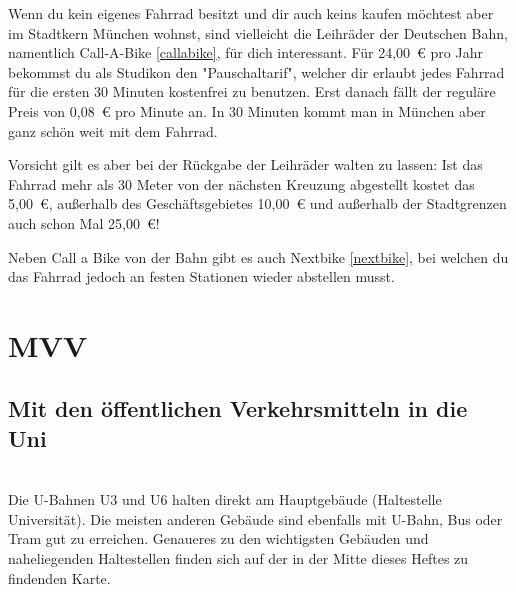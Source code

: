 Wenn du kein eigenes Fahrrad besitzt und dir auch keins kaufen möchtest aber im Stadtkern München wohnst, sind vielleicht die Leihräder der Deutschen Bahn, namentlich Call-A-Bike \ref{callabike}, für dich interessant. Für 24,00~€ pro Jahr bekommst du als Studikon den "Pauschaltarif", welcher dir erlaubt jedes Fahrrad für die ersten 30 Minuten kostenfrei zu benutzen. Erst danach fällt der reguläre Preis von 0,08~€ pro Minute an. In 30 Minuten kommt man in München aber ganz schön weit mit dem Fahrrad.

Vorsicht gilt es aber bei der Rückgabe der Leihräder walten zu lassen: Ist das Fahrrad mehr als 30 Meter von der nächsten Kreuzung abgestellt kostet das 5,00~€, außerhalb des Geschäftsgebietes 10,00~€ und außerhalb der Stadtgrenzen auch schon Mal 25,00~€!

Neben Call a Bike von der Bahn gibt es auch Nextbike \ref{nextbike}, bei welchen du das Fahrrad jedoch an festen Stationen wieder abstellen musst.

\begin{urlList}
\end{urlList}



\section{MVV}

\subsection*{Mit den öffentlichen Verkehrsmitteln in die Uni}\hfill\\
Die U-Bahnen U3 und U6 halten direkt am Hauptgebäude (Haltestelle Universität). Die meisten anderen Gebäude sind ebenfalls mit U-Bahn, Bus oder Tram gut zu erreichen. Genaueres zu den wichtigsten Gebäuden und naheliegenden Haltestellen finden sich auf der in der Mitte dieses Heftes zu findenden Karte.

